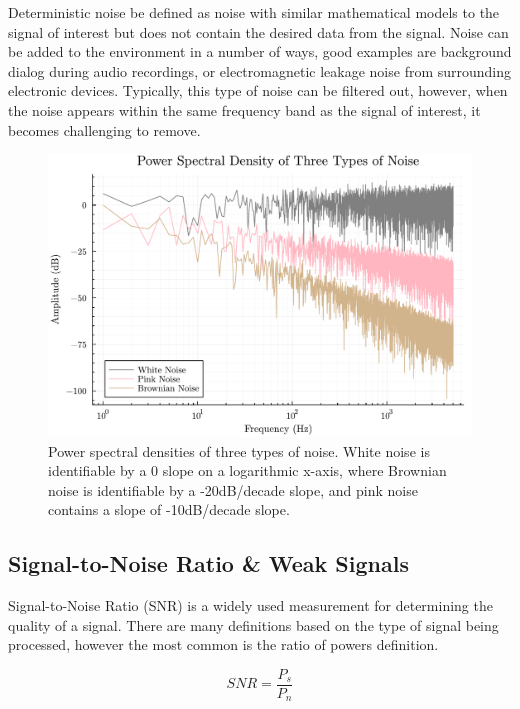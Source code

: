             Deterministic noise be defined as noise with similar mathematical models to the signal of interest but does not contain the desired data from the signal. Noise can be added to the environment in a number of ways, good examples are background dialog during audio recordings, or electromagnetic leakage noise from surrounding electronic devices. Typically, this type of noise can be filtered out, however, when the noise appears within the same frequency band as the signal of interest, it becomes challenging to remove.

            \begin{figure}[h] \label{fig:Noise_PSD}
                \centering
                \includegraphics[scale = 0.6]{images/Background/Colors_of_noise.pdf}
                \caption{Power spectral densities of three types of noise. White noise is identifiable by a 0 slope on a logarithmic x-axis, where Brownian noise is identifiable by a -20dB/decade slope, and pink noise contains a slope of -10dB/decade slope.}
            \end{figure}

        \subsection{Signal-to-Noise Ratio \& Weak Signals} \label{ss:weak_signals}
            Signal-to-Noise Ratio (SNR) is a widely used measurement for determining the quality of a signal. There are many definitions based on the type of signal being processed, however the most common is the ratio of powers definition.

            \begin{equation}
                SNR = \frac{P_s}{P_n}
            \end{equation}
            
